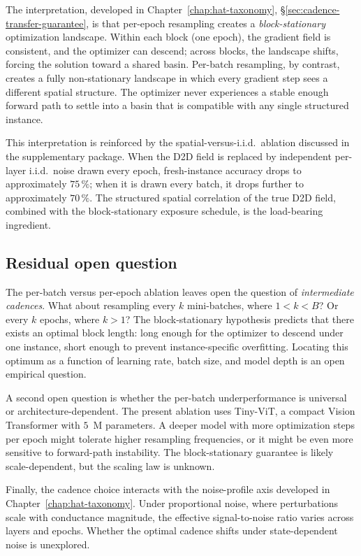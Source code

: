 The interpretation, developed in Chapter~\ref{chap:hat-taxonomy}, \S\ref{sec:cadence-transfer-guarantee}, is that per-epoch resampling creates a \emph{block-stationary} optimization landscape. Within each block (one epoch), the gradient field is consistent, and the optimizer can descend; across blocks, the landscape shifts, forcing the solution toward a shared basin. Per-batch resampling, by contrast, creates a fully non-stationary landscape in which every gradient step sees a different spatial structure. The optimizer never experiences a stable enough forward path to settle into a basin that is compatible with any single structured instance.

This interpretation is reinforced by the spatial-versus-i.i.d.~ablation discussed in the supplementary package. When the D2D field is replaced by independent per-layer i.i.d.~noise drawn every epoch, fresh-instance accuracy drops to approximately $75\,\%$; when it is drawn every batch, it drops further to approximately $70\,\%$. The structured spatial correlation of the true D2D field, combined with the block-stationary exposure schedule, is the load-bearing ingredient.

\subsection{Residual open question}

The per-batch versus per-epoch ablation leaves open the question of \emph{intermediate cadences}. What about resampling every $k$ mini-batches, where $1 < k < B$? Or every $k$ epochs, where $k > 1$? The block-stationary hypothesis predicts that there exists an optimal block length: long enough for the optimizer to descend under one instance, short enough to prevent instance-specific overfitting. Locating this optimum as a function of learning rate, batch size, and model depth is an open empirical question.

A second open question is whether the per-batch underperformance is universal or architecture-dependent. The present ablation uses Tiny-ViT, a compact Vision Transformer with $5$~M parameters. A deeper model with more optimization steps per epoch might tolerate higher resampling frequencies, or it might be even more sensitive to forward-path instability. The block-stationary guarantee is likely scale-dependent, but the scaling law is unknown.

Finally, the cadence choice interacts with the noise-profile axis developed in Chapter~\ref{chap:hat-taxonomy}. Under proportional noise, where perturbations scale with conductance magnitude, the effective signal-to-noise ratio varies across layers and epochs. Whether the optimal cadence shifts under state-dependent noise is unexplored.


